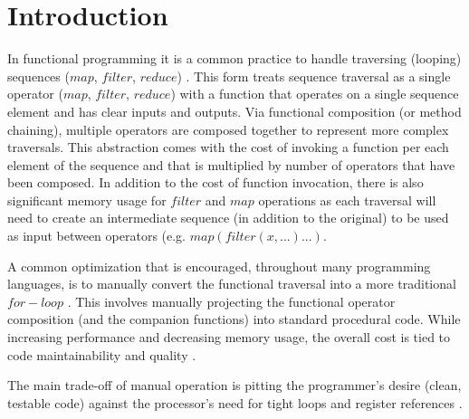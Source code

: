\chapter{Introduction}
In functional programming it is a common practice to handle traversing (looping) sequences ($map$, $filter$, $reduce$) \cite{TODO}. This form treats sequence traversal as a single operator ($map$, $filter$, $reduce$) with a function that operates on a single sequence element and has clear inputs and outputs.  Via functional composition (or method chaining), multiple operators are composed together to represent more complex traversals.  This abstraction comes with the cost of invoking a function per each element of the sequence and that is multiplied by number of operators that have been composed. In addition to the cost of function invocation, there is also significant memory usage for $filter$ and $map$ operations as each traversal will need to create an intermediate sequence (in addition to the original) to be used as input between operators (e.g. $map(filter(x, ...)...)$.  

A common optimization that is encouraged, throughout many programming languages, is to manually convert the functional traversal into a more traditional $for-loop$ \cite{TODO}.  This involves manually projecting the functional operator composition (and the companion functions) into standard procedural code.  While increasing performance and decreasing memory usage, the overall cost is tied to code maintainability and quality \cite{TODO}.  

The main trade-off of manual operation is pitting the programmer's desire (clean, testable code) against the processor's need for tight loops and register references \cite{TODO}.  